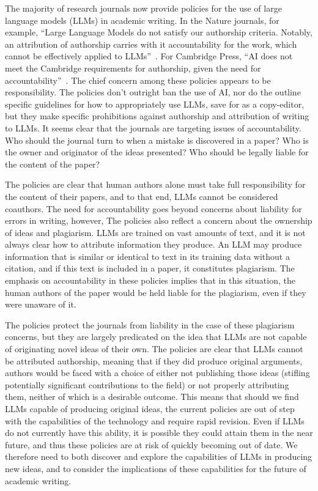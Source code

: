 The majority of research journals now provide policies for the use of large
language models (LLMs) in academic writing. In the Nature journals, for example,
``Large Language Models do not satisfy our authorship criteria. Notably, an
attribution of authorship carries with it accountability for the work, which
cannot be effectively applied to LLMs''~\citep{nature_ai_policies}. For Cambridge
Press, ``AI does not meet the Cambridge requirements for authorship, given the
need for accountability''~\citep{cambridge_ai_policies}. The chief concern among
these policies appears to be responsibility. The policies don't outright ban the
use of AI, nor do the outline specific guidelines for how to appropriately use
LLMs, save for as a copy-editor, but they make specific prohibitions against
authorship and attribution of writing to LLMs. It seems clear that the journals
are targeting issues of accountability. Who should the journal turn to when a
mistake is discovered in a paper? Who is the owner and originator of the ideas
presented? Who should be legally liable for the content of the paper? 

The policies are clear that human authors alone must take
full responsibility for the content of their papers, and to that end, LLMs
cannot be considered coauthors. The need for accountability goes beyond concerns
about liability for errors in writing, however, The policies also reflect a
concern about the ownership of ideas and plagiarism. LLMs are trained on vast 
amounts of text, and it is not always clear how to attribute information they
produce. An LLM may produce information that is similar or identical to text in
its training data without a citation, and if this text is included in a paper,
it constitutes plagiarism. The emphasis on accountability in these policies
implies that in this situation, the human authors of the paper would be held
liable for the plagiarism, even if they were unaware of it.

The policies protect the journals from liability in the case of these plagiarism
concerns, but they are largely predicated on the idea that LLMs are not capable
of originating novel ideas of their own. The policies are clear that LLMs cannot
be attributed authorship, meaning that if they did produce original arguments,
authors would be faced with a choice of either not publishing those ideas 
(stifling potentially significant contributions to the field) or not properly
attributing them, neither of which is a desirable outcome. This means that
should we find LLMs capable of producing original ideas, the current policies
are out of step with the capabilities of the technology and require rapid 
revision. Even if LLMs do not currently have this ability, it is possible they
could attain them in the near future, and thus these policies are at risk of
quickly becoming out of date. We therefore need to both discover and explore the
capabilities of LLMs in producing new ideas, and to consider the implications
of these capabilities for the future of academic writing.

